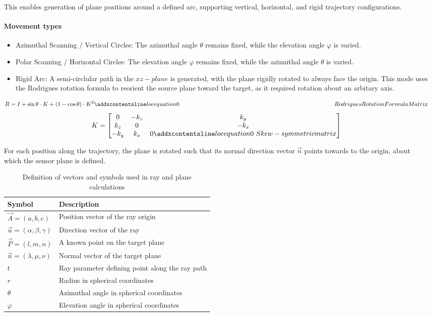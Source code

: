 This enables generation of plane positions around a defined arc, supporting vertical, horizontal, and rigid trajectory configurations.

\paragraph{Movement types}
\begin{itemize}
    \item Azimuthal Scanning / Vertical Circles: The azimuthal angle $\theta$ remains fixed, while the elevation angle $\varphi$ is varied. 
    \item Polar Scanning / Horizontal Circles: The elevation angle $\varphi$ remains fixed, while the azimuthal angle $\theta$ is varied. 
    \item Rigid Arc: A semi-circlular path in the $xz-plane$ is generated, with the plane rigidly rotated to always face the origin. This mode uses the Rodrigues rotation formula to reorient the source plane toward the target, as it required rotation about an arbitary axis.  
\end{itemize}

\begin{equation}
R = I + \sin\theta \cdot K + (1 - \cos\theta) \cdot K^2
\label{eq:RodriguesMatrix}
\addequation{Rodrigues Rotation Formula Matrix}
\end{equation}
\begin{equation}
K = 
\begin{bmatrix}
0 & -k_z & k_y \\
k_z & 0 & -k_x \\
-k_y & k_x & 0
\addequation{Skew-symmetric matrix}
\end{bmatrix}
\end{equation}

For each position along the trajectory, the plane is rotated such that its normal direction vector $\vec{n}$ points towards to the origin, about which the sensor plane is defined.  

\begin{table}[H]
\centering
\caption{Definition of vectors and symbols used in ray and plane calculations}
\label{tab:symbols}
\begin{tabular}{ll}
\toprule
\textbf{Symbol} & \textbf{Description} \\
\midrule
$\vec{A} = (a, b, c)$ & Position vector of the ray origin \\
$\vec{u} = (\alpha, \beta, \gamma)$ & Direction vector of the ray \\
$\vec{P} = (l, m, n)$ & A known point on the target plane \\
$\vec{n} = (\lambda, \mu, \nu)$ & Normal vector of the target plane \\
$t$ & Ray parameter defining point along the ray path \\
$r$ & Radius in spherical coordinates \\
$\theta$ & Azimuthal angle in spherical coordinates \\
$\varphi$ & Elevation angle in spherical coordinates \\
\bottomrule
\end{tabular}
\end{table}